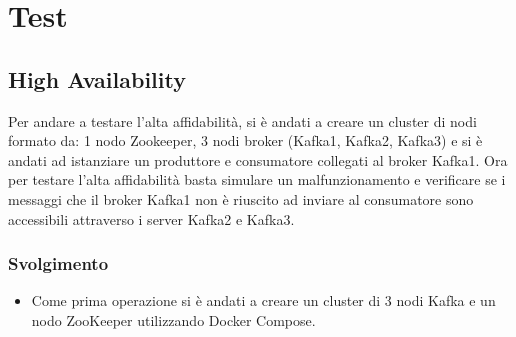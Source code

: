 \documentclass{article}
\begin{document}
\section{Test}
\subsection{High Availability}
Per andare a testare l'alta affidabilità, si è andati a creare un cluster di nodi formato da: 1 nodo Zookeeper, 3 nodi broker (Kafka1, Kafka2, Kafka3) e si è andati ad istanziare un produttore e consumatore collegati al broker Kafka1. Ora per testare l'alta affidabilità basta simulare un malfunzionamento e verificare se i messaggi che il broker Kafka1 non è riuscito ad inviare al consumatore sono accessibili attraverso i server Kafka2 e Kafka3. 

\subsubsection{Svolgimento}
\begin{itemize}
    \item Come prima operazione si è andati a creare un cluster di 3 nodi Kafka e un nodo ZooKeeper utilizzando Docker Compose.
\end{itemize}
\end{document}
